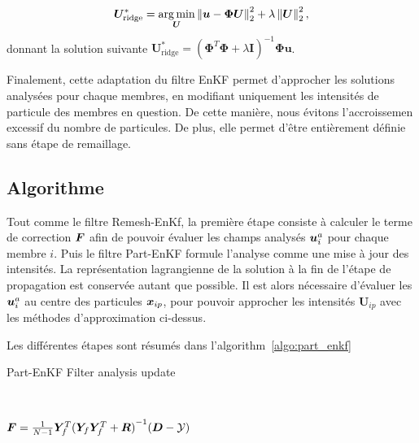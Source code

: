 \begin{equation*}
    \bm{U}_{\text{ridge}}^* = \operatorname*{arg\,min}_{\bm{U}} \left\lVert \bm{u} - \bm \Phi \bm{U} \right\rVert_2^2 + \lambda \left\lVert \bm{U} \right\rVert^2_2,
\end{equation*}donnant la solution suivante $\bm{U}^*_{\text{ridge}} = (\bm \Phi^T \bm \Phi + \lambda \bm I)^{-1} \bm \Phi \bm{u}$.

Finalement, cette adaptation du filtre EnKF permet d'approcher les solutions analysées pour chaque membres, en modifiant uniquement les intensités de particule des membres en question. De cette manière, nous évitons l'accroissemen excessif du nombre de particules. De plus, elle permet d'être entièrement définie sans étape de remaillage.

\subsection{Algorithme}

Tout comme le filtre Remesh-EnKf, la première étape consiste à calculer le terme de correction $\bm{F}$ afin de pouvoir évaluer les champs analysés $\bm{u}_i^a$ pour chaque membre $i$. Puis le filtre Part-EnKF formule l'analyse comme une mise à jour des intensités. La représentation lagrangienne de la solution à la fin de l'étape de propagation est conservée autant que possible. Il est alors nécessaire d'évaluer les $\bm{u}_i^a$ au centre des particules $\bm{x}_{ip}$, pour pouvoir approcher les intensités $\bm U_{ip}$ avec les méthodes d'approximation ci-dessus.

Les différentes étapes sont résumés dans l'algorithm~\ref{algo:part_enkf}
\begin{algorithm}
    \caption{Part-EnKF Filter analysis update}~\label{algo:part_enkf}

    $ \bm{F} = \frac{1}{N-1}\bm Y_f^T {(\bm Y_f \bm Y_f^T + \bm R)}^{-1}(\bm{D} - \mathcal{Y})$ 
\end{algorithm}

